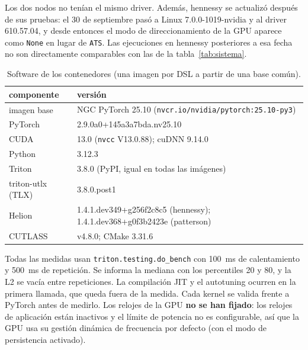 Los dos nodos no tenían el mismo driver. Además, hennessy se actualizó después de sus
pruebas: el 30 de septiembre pasó a Linux 7.0.0-1019-nvidia y al driver 610.57.04, y desde
entonces el modo de direccionamiento de la GPU aparece como \texttt{None} en lugar de
\texttt{ATS}. Las ejecuciones en hennessy posteriores a esa fecha no son directamente
comparables con las de la tabla~\ref{tab:sistema}.

\begin{table}[htbp]
  \centering\small
  \begin{tabularx}{\linewidth}{lX}
    \toprule
    componente & versión \\
    \midrule
    imagen base & NGC PyTorch 25.10 (\texttt{nvcr.io/nvidia/pytorch:25.10-py3}) \\
    PyTorch & 2.9.0a0+145a3a7bda.nv25.10 \\
    CUDA & 13.0 (\texttt{nvcc} V13.0.88); cuDNN 9.14.0 \\
    Python & 3.12.3 \\
    Triton & 3.8.0 (PyPI, igual en todas las imágenes) \\
    triton-utlx (TLX) & 3.8.0.post1 \\
    Helion & 1.4.1.dev349+g256f2c8c5 (hennessy); 1.4.1.dev368+g0f3b2423e (patterson) \\
    CUTLASS & v4.8.0; CMake 3.31.6 \\
    \bottomrule
  \end{tabularx}
  \caption{Software de los contenedores (una imagen por DSL a partir de una base común).}
  \label{tab:contenedores}
\end{table}

Todas las medidas usan \texttt{triton.testing.do\_bench} con 100~ms de calentamiento y
500~ms de repetición. Se informa la mediana con los percentiles 20 y 80, y la L2 se vacía
entre repeticiones. La compilación JIT y el autotuning ocurren en la primera llamada, que
queda fuera de la medida. Cada kernel se valida frente a PyTorch antes de medirlo. Los
relojes de la GPU \textbf{no se han fijado}: los relojes de aplicación están inactivos y el
límite de potencia no es configurable, así que la GPU usa su gestión dinámica de frecuencia
por defecto (con el modo de persistencia activado).
